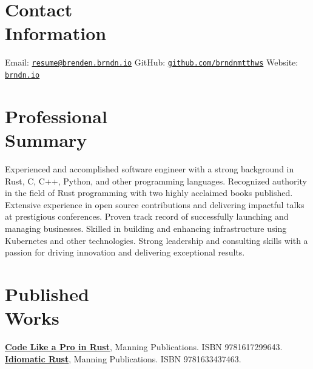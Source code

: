 \documentclass[margin,line]{resume}
\begin{document}
 
\begin{resume}

\section{\mysidestyle Contact\\Information}

Email: \href{mailto:resume@brenden.brndn.io}{\texttt{resume@brenden.brndn.io}} \hfill
GitHub: \href{https://github.com/brndnmtthws}{\texttt{github.com/brndnmtthws}} \hfill
Website: \href{https://brndn.io}{\texttt{brndn.io}} \hfill
\vspace{3mm}

\section{\mysidestyle Professional\\Summary}

Experienced and accomplished software engineer with a strong background in Rust, C, C++, Python, and other programming languages. Recognized authority in the field of Rust programming with two highly acclaimed books published. Extensive experience in open source contributions and delivering impactful talks at prestigious conferences. Proven track record of successfully launching and managing businesses. Skilled in building and enhancing infrastructure using Kubernetes and other technologies. Strong leadership and consulting skills with a passion for driving innovation and delivering exceptional results.

\section{\mysidestyle Published\\Works}

\href{https://www.manning.com/books/code-like-a-pro-in-rust}{\textbf{Code Like a Pro in Rust}}, Manning Publications. ISBN 9781617299643.
\linebreak \href{https://www.manning.com/books/idiomatic-rust}{\textbf{Idiomatic Rust}}, Manning Publications. ISBN 9781633437463.


\end{resume}
\end{document}
